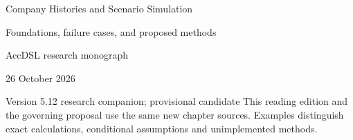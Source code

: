 \documentclass[11pt,a4paper]{report}
\begin{document}
\hypersetup{pageanchor=false}
\begin{titlepage}
{\Huge Company Histories and Scenario Simulation\par}
\vspace{12mm}
{\Large Foundations, failure cases, and proposed methods\par}
\vspace{8mm}
AccDSL research monograph\par 26 October 2026\par Version 5.12 research companion; provisional candidate
\vfill
This reading edition and the governing proposal use the same new chapter sources. Examples distinguish exact calculations, conditional assumptions and unimplemented methods.
\end{titlepage}
\hypersetup{pageanchor=true}
\tableofcontents
\clearpage{}


























\clearpage\label{sim:body-end}

\begingroup\raggedright
\endgroup
\end{document}
